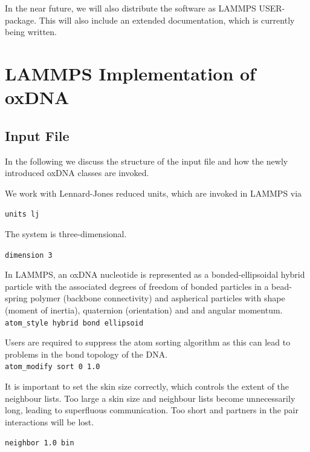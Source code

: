 \documentclass[12pt,onecolumn]{article}
\begin{document}
\smallskip

\noindent In the near future, we will also distribute the software as LAMMPS USER-package. This will also include an extended documentation,
which is currently being written.



\section{LAMMPS Implementation of oxDNA}
\subsection{Input File}

In the following we discuss the structure of the input file and how the newly introduced oxDNA classes are invoked.

\noindent We work with Lennard-Jones reduced units, which are invoked in LAMMPS via

\smallskip
\texttt{units lj}
\smallskip

\noindent The system is three-dimensional.

\smallskip
\texttt{dimension 3}
\smallskip

\noindent In LAMMPS, an oxDNA nucleotide is represented as a bonded-ellipsoidal hybrid particle with the associated degrees of freedom of 
bonded particles in a bead-spring polymer (backbone connectivity) and aspherical particles 
with shape (moment of inertia), quaternion (orientation) and and angular momentum.\\

\smallskip
\texttt{atom\_style hybrid bond ellipsoid}\\
\smallskip

\noindent Users are required to suppress the atom sorting algorithm as this can lead to problems in the bond topology of the DNA.\\

\smallskip
\texttt{atom\_modify sort 0 1.0}\\
\smallskip

\noindent It is important to set the skin size correctly, which controls the extent of the neighbour lists. Too large a skin size and neighbour lists
become unnecessarily long, leading to superfluous communication. Too short and partners in the pair interactions will be
lost. 

\smallskip
\texttt{neighbor 1.0 bin}\\
\smallskip
\end{document}
